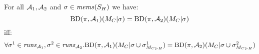 \begin{lemma}
  For all $\mathcal{A}_1,\mathcal{A}_2$ and $\sigma \in \mathit{mems}(S_H)$ we have:
  $$
  \mathrm{BD}(\pi,\mathcal{A}_1)(M_C|\sigma) = \mathrm{BD}(\pi,\mathcal{A}_2)(M_C|\sigma) \\
  $$
  iff:
  $$
  \forall \sigma^1 \in \mathit{runs}_{\mathcal{A}_1},\sigma^2 \in \mathit{runs}_{\mathcal{A}_2} . 
  \mathrm{BD}(\pi,\mathcal{A}_1)(M_C|\sigma \cup \sigma^1_{M_{C \rhd H}}) =
  \mathrm{BD}(\pi,\mathcal{A}_2)(M_C|\sigma \cup \sigma^2_{M_{C \rhd H}})
  $$
\end{lemma}

